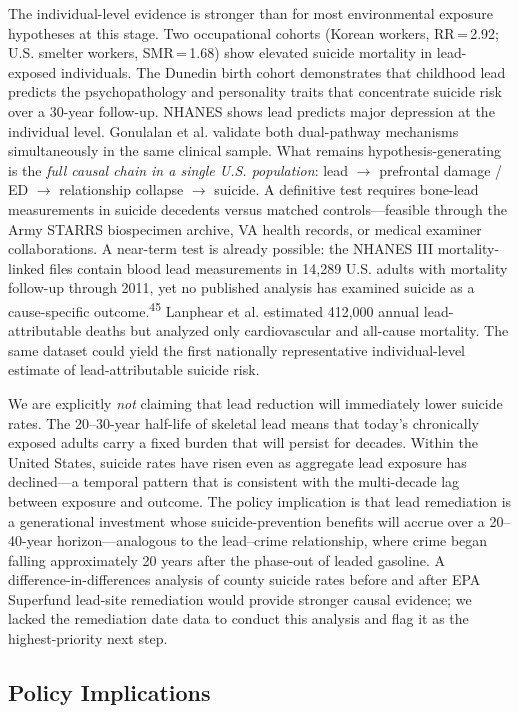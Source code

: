\documentclass[11pt,twocolumn]{article}
\begin{document}
The individual-level evidence is stronger than for most environmental exposure hypotheses at this stage. Two occupational cohorts (Korean workers, RR\,=\,2.92; U.S. smelter workers, SMR\,=\,1.68) show elevated suicide mortality in lead-exposed individuals. The Dunedin birth cohort demonstrates that childhood lead predicts the psychopathology and personality traits that concentrate suicide risk over a 30-year follow-up. NHANES shows lead predicts major depression at the individual level. Gonulalan et al. validate both dual-pathway mechanisms simultaneously in the same clinical sample. What remains hypothesis-generating is the \textit{full causal chain in a single U.S. population}: lead $\rightarrow$ prefrontal damage / ED $\rightarrow$ relationship collapse $\rightarrow$ suicide. A definitive test requires bone-lead measurements in suicide decedents versus matched controls---feasible through the Army STARRS biospecimen archive, VA health records, or medical examiner collaborations. A near-term test is already possible: the NHANES III mortality-linked files contain blood lead measurements in 14,289 U.S. adults with mortality follow-up through 2011, yet no published analysis has examined suicide as a cause-specific outcome.\textsuperscript{45} Lanphear et al. estimated 412,000 annual lead-attributable deaths but analyzed only cardiovascular and all-cause mortality. The same dataset could yield the first nationally representative individual-level estimate of lead-attributable suicide risk.

We are explicitly \textit{not} claiming that lead reduction will immediately lower suicide rates. The 20--30-year half-life of skeletal lead means that today's chronically exposed adults carry a fixed burden that will persist for decades. Within the United States, suicide rates have risen even as aggregate lead exposure has declined---a temporal pattern that is consistent with the multi-decade lag between exposure and outcome. The policy implication is that lead remediation is a generational investment whose suicide-prevention benefits will accrue over a 20--40-year horizon---analogous to the lead--crime relationship, where crime began falling approximately 20 years after the phase-out of leaded gasoline. A difference-in-differences analysis of county suicide rates before and after EPA Superfund lead-site remediation would provide stronger causal evidence; we lacked the remediation date data to conduct this analysis and flag it as the highest-priority next step.

\subsection{Policy Implications}
\end{document}
